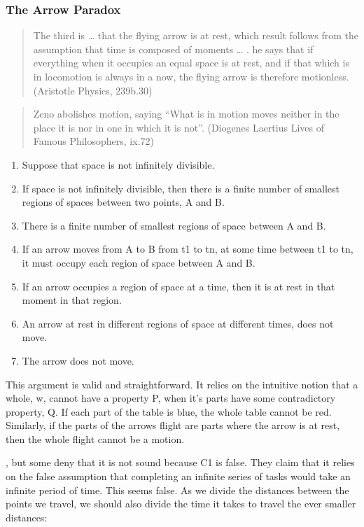 \documentclass[]{article}
\providecommand{\tightlist}{%
  \setlength{\itemsep}{0pt}\setlength{\parskip}{0pt}}
\begin{document}
\subsubsection{The Arrow Paradox}\label{the-arrow-paradox}

\begin{quote}
The third is \ldots{} that the flying arrow is at rest, which result
follows from the assumption that time is composed of moments \ldots{} .
he says that if everything when it occupies an equal space is at rest,
and if that which is in locomotion is always in a now, the flying arrow
is therefore motionless. (Aristotle Physics, 239b.30)
\end{quote}

\begin{quote}
Zeno abolishes motion, saying ``What is in motion moves neither in the
place it is nor in one in which it is not''. (Diogenes Laertius Lives of
Famous Philosophers, ix.72)
\end{quote}

\begin{enumerate}
\def\labelenumi{\arabic{enumi}.}
\tightlist
\item
  Suppose that space is not infinitely divisible.
\item
  If space is not infinitely divisible, then there is a finite number of
  smallest regions of spaces between two points, A and B.
\item
  There is a finite number of smallest regions of space between A and B.
\item
  If an arrow moves from A to B from t1 to tn, at some time between t1
  to tn, it must occupy each region of space between A and B.
\item
  If an arrow occupies a region of space at a time, then it is at rest
  in that moment in that region.
\item
  An arrow at rest in different regions of space at different times,
  does not move.
\item
  The arrow does not move.
\end{enumerate}

This argument is valid and straightforward. It relies on the intuitive
notion that a whole, w, cannot have a property P, when it's parts have
some contradictory property, Q. If each part of the table is blue, the
whole table cannot be red. Similarly, if the parts of the arrows flight
are parts where the arrow is at rest, then the whole flight cannot be a
motion.

, but some deny that it is not sound because C1 is false. They claim
that it relies on the false assumption that completing an infinite
series of tasks would take an infinite period of time. This seems false.
As we divide the distances between the points we travel, we should also
divide the time it takes to travel the ever smaller distances:
\end{document}
